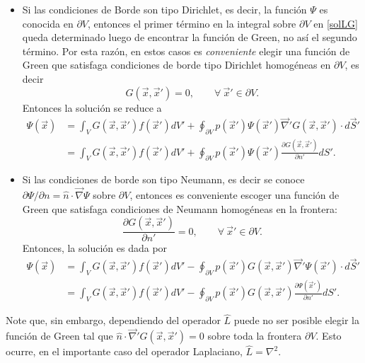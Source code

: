 \begin{itemize}
\item Si las condiciones de Borde son tipo Dirichlet, es decir, la función $\Psi$ es conocida en $\partial V$, entonces el primer término en la integral sobre $\partial V$ en \eqref{solLG} queda determinado luego de encontrar la función de Green, no así el segundo término. Por esta razón, en estos casos es \textit{conveniente} elegir una función de Green que satisfaga condiciones de borde tipo Dirichlet homogéneas en $\partial V$, es decir
\begin{equation}
G(\vec{x},\vec{x}')=0, \qquad \forall\ \vec{x}'\in\partial V.
\end{equation}
Entonces la solución se reduce a
\begin{align}
\Psi(\vec{x}) &= \int_VG(\vec{x},\vec{x}')f(\vec{x}')dV'+\oint_{\partial V}p(\vec{x}')\Psi(\vec{x}')\vec\nabla' G(\vec{x},\vec{x}')\cdot d\vec{S}' \\
&= \int_VG(\vec{x},\vec{x}')f(\vec{x}')dV'+\oint_{\partial V}p(\vec{x}')\Psi(\vec{x}')\frac{\partial G(\vec{x},\vec{x}')}{\partial n'}dS'.
\end{align}

\item Si las condiciones de borde son tipo Neumann, es decir se conoce $\partial\Psi/\partial n=\hat{n}\cdot\vec\nabla\Psi$ sobre $\partial V$, entonces es conveniente escoger una función de Green que satisfaga condiciones de Neumann homogéneas en la frontera:
\begin{equation}
\frac{\partial G(\vec{x},\vec{x}')}{\partial n'}=0, \qquad \forall\ \vec{x}'\in\partial V.
\end{equation}
Entonces, la solución es dada por
\begin{align}
\Psi(\vec{x}) &= \int_VG(\vec{x},\vec{x}')f(\vec{x}')dV'-\oint_{\partial V}p(\vec{x}')G(\vec{x},\vec{x}')\vec\nabla'\Psi(\vec{x}')\cdot d\vec{S}' \\
&= \int_VG(\vec{x},\vec{x}')f(\vec{x}')dV'-\oint_{\partial V}p(\vec{x}')G(\vec{x},\vec{x}')\frac{\partial \Psi(\vec{x}')}{\partial n'}dS'.
\end{align}
\end{itemize}

Note que, sin embargo, dependiendo del operador $\hat{L}$ puede no ser posible elegir la función de Green tal que $\hat{n}\cdot\vec\nabla'G(\vec{x},\vec{x}')=0$ sobre toda la frontera $\partial V$. Esto ocurre, en el importante caso del operador Laplaciano, $\hat{L}=\nabla^2$.


